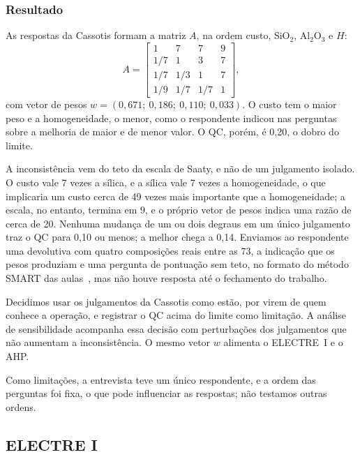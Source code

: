 \documentclass[conference]{IEEEtran}
\begin{document}
\subsubsection{Resultado}

As respostas da Cassotis formam a matriz $A$, na ordem custo, SiO$_2$, Al$_2$O$_3$ e $H$:
\begin{equation}
A=\begin{bmatrix}
1 & 7 & 7 & 9\\
1/7 & 1 & 3 & 7\\
1/7 & 1/3 & 1 & 7\\
1/9 & 1/7 & 1/7 & 1
\end{bmatrix},
\end{equation}
com vetor de pesos $w=(0{,}671;\ 0{,}186;\ 0{,}110;\ 0{,}033)$. O custo tem o maior peso e a homogeneidade, o menor, como o respondente indicou nas perguntas sobre a melhoria de maior e de menor valor. O QC, porém, é 0{,}20, o dobro do limite.

A inconsistência vem do teto da escala de Saaty, e não de um julgamento isolado. O custo vale 7 vezes a sílica, e a sílica vale 7 vezes a homogeneidade, o que implicaria um custo cerca de 49 vezes mais importante que a homogeneidade; a escala, no entanto, termina em 9, e o próprio vetor de pesos indica uma razão de cerca de 20. Nenhuma mudança de um ou dois degraus em um único julgamento traz o QC para 0{,}10 ou menos; a melhor chega a 0{,}14. Enviamos ao respondente uma devolutiva com quatro composições reais entre as 73, a indicação que os pesos produziam e uma pergunta de pontuação sem teto, no formato do método SMART das aulas~\cite{aula10}, mas não houve resposta até o fechamento do trabalho.

Decidimos usar os julgamentos da Cassotis como estão, por virem de quem conhece a operação, e registrar o QC acima do limite como limitação. A análise de sensibilidade acompanha essa decisão com perturbações dos julgamentos que não aumentam a inconsistência. O mesmo vetor $w$ alimenta o ELECTRE~I e o AHP.

Como limitações, a entrevista teve um único respondente, e a ordem das perguntas foi fixa, o que pode influenciar as respostas; não testamos outras ordens.

\subsection{ELECTRE I}\label{sec:electre}
\end{document}
